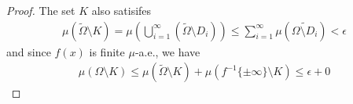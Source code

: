 \begin{proof}
  The set $K$ also satisifes 
  \begin{align*}
    \mu(\tilde{\Omega} \setminus K) = \mu\left(
      \bigcup_{i=1}^{\infty} (\tilde{\Omega} \setminus D_i)
    \right)
    \leq \sum_{i=1}^{\infty} \mu(\tilde{\Omega \setminus D_i}) < \epsilon
  \end{align*}
  and since $f(x)$ is finite $\mu$-a.e., we have
  \begin{align*}
    \mu(\Omega \setminus K) \leq \mu(\tilde{\Omega} \setminus K) + \mu(f^{-1}\{\pm \infty\} \setminus K) \leq \epsilon + 0
  \end{align*}

\end{proof}



